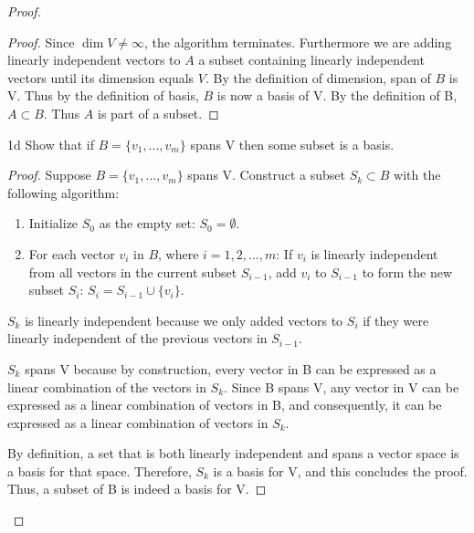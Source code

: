 \documentclass{article}
\begin{document}
\begin{proof}
\begin{proof}
		Since $\dim V \neq \infty$, the algorithm terminates. Furthermore we are adding linearly independent vectors to $A$ a subset containing linearly independent vectors until its dimension equals $V$. By the definition of dimension, span of $B$ is V. Thus by the definition of basis, $B$ is now a basis of V. By the definition of B, $A \subset B$. Thus $A$ is part of a subset.

	\end{proof}

	\begin{claim}{1d}
		Show that if $B = \{v_1,...,v_m\}$ spans V then some subset is a basis.
	\end{claim}
	\begin{proof}
		Suppose $B = \{v_1,...,v_m\}$ spans V. Construct a subset $S_k \subset B$ with the following algorithm:


		\begin{enumerate}{}
			\item Initialize $S_0$ as the empty set: $S_0 = \emptyset$.
			\item For each vector $v_i$ in $B$, where $i = 1, 2, \ldots, m$:
			      If $v_i$ is linearly independent from all vectors in the current subset $S_{i-1}$, add $v_i$ to $S_{i-1}$ to form the new subset $S_i$: $S_i = S_{i-1} \cup \{v_i\}$.

		\end{enumerate}

		$S_k$ is linearly independent because we only added vectors to $S_{i}$ if they were linearly independent of the previous vectors in $S_{i-1}$.

		$S_k$ spans V because by construction, every vector in B can be expressed as a linear combination of the vectors in $S_k$. Since B spans V, any vector in V can be expressed as a linear combination of vectors in B, and consequently, it can be expressed as a linear combination of vectors in $S_k$.

		By definition, a set that is both linearly independent and spans a vector space is a basis for that space. Therefore, $S_k$ is a basis for V, and this concludes the proof. Thus, a subset of B is indeed a basis for V.

	\end{proof}
\end{proof}
\pagebreak
\end{document}
